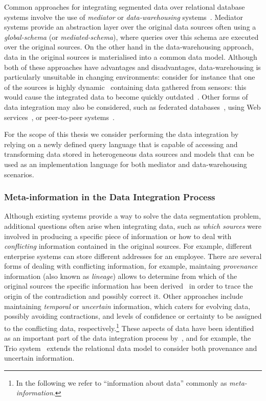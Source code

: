 Common approaches for integrating segmented data over relational database systems involve the use of \emph{mediator} or
\emph{data-warehousing} systems~\cite{Wiederhold:1992aa,AbiteboulBunemanSuciu:1999aa,ZieglerDittrich:2004aa}.
%
Mediator systems provide an abstraction layer over the original data sources often using a \emph{global-schema} (or
\emph{mediated-schema}), where queries over this schema are executed over the original sources.  On the other hand in
the data-warehousing approach, data in the original sources is materialised into a common data model.
%
Although both of these approaches have advantages and disadvantages, data-warehousing is particularly unsuitable in
changing environments: 
%
consider for instance that one of the sources is highly dynamic \eg~containing data gathered from sensors: this would
cause the integrated data to become quickly outdated~\cite{AbiteboulBunemanSuciu:1999aa}.
%
Other forms of data integration may also be considered, such as federated databases~\cite{ShethLarson:1990aa}, using Web
services~\cite{AbiteboulBenjellounMilo:2002aa}, or peer-to-peer systems~\cite{ArenasKantereKementsietsidis:2003aa}.

For the scope of this thesis we consider performing the data integration by relying on a newly defined query language
that is capable of accessing and transforming data stored in heterogeneous data sources and models that can be used as
an implementation language for both mediator and data-warehousing scenarios.


\subsubsection*{Meta-information in the Data Integration Process}

Although existing systems provide a way to solve the data segmentation problem, additional questions often arise when
integrating data, such as \emph{which sources} were involved in producing a specific piece of information or how to deal
with \emph{conflicting} information contained in the original sources.  For example, different enterprise systems can
store different addresses for an employee.
%
There are several forms of dealing with conflicting information, for example, maintaing \emph{provenance} information
(also known as \emph{lineage}) allows to determine from which of the original sources the specific information has been
derived~\cite{CuiWidomWiener:2000aa,WoodruffStonebraker:1997aa,BenjellounSarmaHalevy:2008aa} in order to trace the
origin of the contradiction and possibly correct it.
%
Other approaches include maintaining \emph{temporal} or \emph{uncertain} information, which caters for evolving data,
possibly avoiding contractions, and levels of confidence or certainty to be assigned to the conflicting data,
respectively.\footnote{In the following we refer to ``information about data'' commonly as \emph{meta-information}.}
%
These aspects of data have been identified as an important part of the data integration process
by~\citet{HalevyRajaramanOrdille:2006aa}, and for example, the Trio
system~\cite{Widom:2005aa,AgrawalBenjellounSarma:2006aa} extends the relational data model to consider both provenance
and uncertain information.
%


